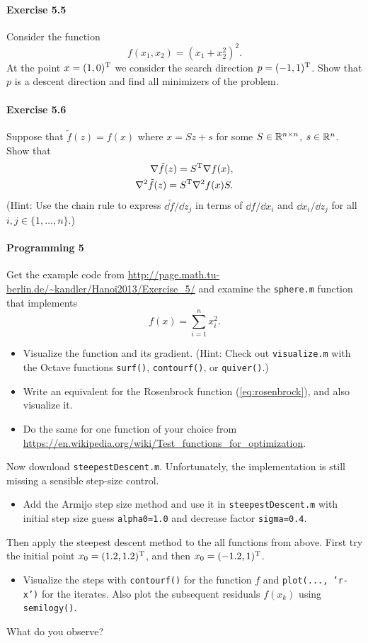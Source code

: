 \paragraph{Exercise 5.5} %
Consider the function
\[
  f(x_1, x_2) = (x_1+x_2^2)^2.
\]
At the point $x=(1,0)^{\text{\upshape T}}$ we consider the search direction $p=(-1,1)^{\text{\upshape T}}$.
Show that $p$ is a descent direction and find all minimizers of the problem.

\paragraph{Exercise 5.6} %
Suppose that $\tilde{f}(z) = f(x)$ where $x=Sz + s$ for some $S\in\mathbb{R}^{n\times
n}$, $s\in\mathbb{R}^n$. Show that
\[
  \begin{split}
  \nabla\tilde{f}(z) = S^{\text{\upshape T}} \nabla f(x),\\
  \nabla^2\tilde{f}(z) = S^{\text{\upshape T}} \nabla^2 f(x) S.
\end{split}
\]
(Hint: Use the chain rule to express $\dd \tilde{f}/\dd z_j$ in terms of $\dd f/\dd x_i$ and $\dd x_i/\dd z_j$ for all $i, j\in\{1,\dots,n\}$.)

\paragraph{Programming 5}  %
Get the example code from \url{http://page.math.tu-berlin.de/~kandler/Hanoi2013/Exercise_5/} and examine the \texttt{sphere.m} function that implements
\[
  f(x) = \sum_{i=1}^n x_i^2.
\]
\begin{itemize}
  \item Visualize the function and its gradient. (Hint: Check out
    \texttt{visualize.m} with the Octave functions \texttt{surf()},
    \texttt{contourf()}, or \texttt{quiver()}.)
  \item Write an equivalent for the Rosenbrock function (\ref{eq:rosenbrock}),
    and also visualize it.
  \item Do the same for one function of your choice from
    \url{https://en.wikipedia.org/wiki/Test_functions_for_optimization}.
\end{itemize}

Now download \texttt{steepestDescent.m}. Unfortunately, the implementation is
still missing a sensible step-size control.
\begin{itemize}
  \item Add the Armijo step size method and use it in
    \texttt{steepestDescent.m} with initial step size guess
    \texttt{alpha0=1.0} and decrease factor \texttt{sigma=0.4}.
\end{itemize}
Then apply the steepest descent method to the all functions from above.  First
try the initial point $x_0=(1.2, 1.2)^{\text{\upshape T}}$, and then $x_0=(-1.2, 1)^{\text{\upshape T}}$.
\begin{itemize}
  \item Visualize the steps with \texttt{contourf()} for the function $f$ and
    \texttt{plot(..., 'r-x')} for the iterates. Also plot the subsequent
    residuals $f(x_k)$ using \texttt{semilogy()}.
\end{itemize}
What do you observe?

